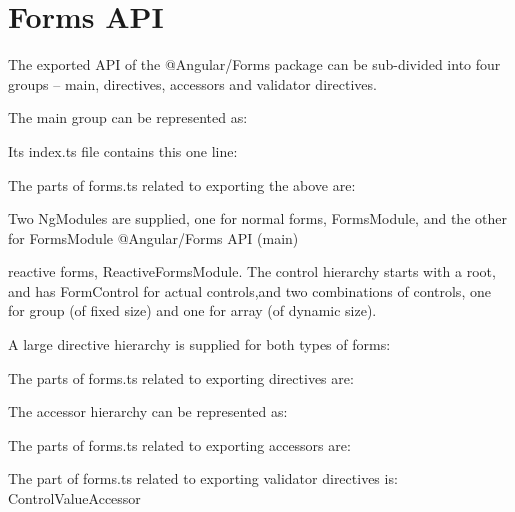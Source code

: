 \section{Forms API}

The exported API of the @Angular/Forms package can be sub-divided into four groups
– main, directives, accessors and validator directives.

The main group can be represented as:

Its index.ts file contains this one line:



The parts of forms.ts related to exporting the above are:



Two NgModules are supplied, one for normal forms, FormsModule, and the other for
FormsModule
@Angular/Forms API (main)

reactive forms, ReactiveFormsModule. The control hierarchy starts with a root, and
has FormControl for actual controls,and two combinations of controls, one for group
(of fixed size) and one for array (of dynamic size).

A large directive hierarchy is supplied for both types of forms:

The parts of forms.ts related to exporting directives are:



The accessor hierarchy can be represented as:

The parts of forms.ts related to exporting accessors are:



The part of forms.ts related to exporting validator directives is:
ControlValueAccessor


